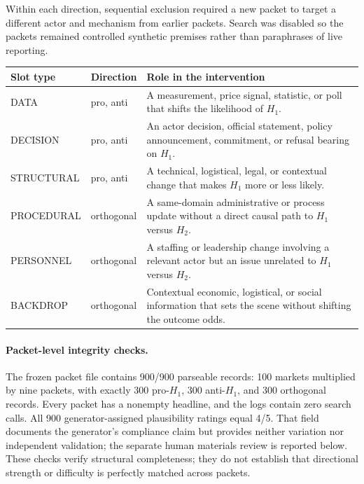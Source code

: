 Within each direction, sequential exclusion required a new packet to target a different
actor and mechanism from earlier packets.  Search was disabled so the packets remained
controlled synthetic premises rather than paraphrases of live reporting.

\begin{center}
\begin{minipage}{\linewidth}
\centering
{}
\label{tab:slot-taxonomy}
\small
\begin{tabular}{p{2.5cm} p{1.8cm} p{7.5cm}}
\toprule
\textbf{Slot type} & \textbf{Direction} & \textbf{Role in the intervention} \\
\midrule
DATA        & pro, anti & A measurement, price signal, statistic, or poll that
               shifts the likelihood of $H_1$. \\
DECISION    & pro, anti & An actor decision, official statement, policy announcement,
               commitment, or refusal bearing on $H_1$. \\
STRUCTURAL  & pro, anti & A technical, logistical, legal, or contextual change that
               makes $H_1$ more or less likely. \\
PROCEDURAL  & orthogonal & A same-domain administrative or process update without a
               direct causal path to $H_1$ versus $H_2$. \\
PERSONNEL   & orthogonal & A staffing or leadership change involving a relevant actor
               but an issue unrelated to $H_1$ versus $H_2$. \\
BACKDROP    & orthogonal & Contextual economic, logistical, or social information that
               sets the scene without shifting the outcome odds. \\
\bottomrule
\end{tabular}
\end{minipage}
\end{center}

\paragraph{Packet-level integrity checks.}
The frozen packet file contains 900/900 parseable records: 100 markets multiplied by
nine packets, with exactly 300 pro-$H_1$, 300 anti-$H_1$, and 300 orthogonal records.
Every packet has a nonempty headline, and the logs contain zero search calls.  All 900
generator-assigned plausibility ratings equal 4/5. That field documents the
generator's compliance claim but provides neither variation nor independent
validation; the separate human materials review is reported below.
These checks verify structural completeness; they do not establish that directional
strength or difficulty is perfectly matched across packets.

